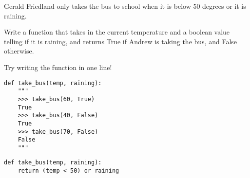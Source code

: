 \begin{blocksection}
\question Gerald Friedland only takes the bus to school when it is below 50 degrees or it is raining.

Write a function that takes in the current temperature and a boolean value telling if it is raining, and returns True if Andrew is taking the bus, and False otherwise.

Try writing the function in one line!

\begin{lstlisting}
def take_bus(temp, raining): 
    """
    >>> take_bus(60, True)
    True
    >>> take_bus(40, False)
    True
    >>> take_bus(70, False)
    False
    """

\end{lstlisting}

\begin{solution}[1.5in]
\begin{lstlisting}
def take_bus(temp, raining):
    return (temp < 50) or raining
\end{lstlisting}
\end{solution}
\end{blocksection}
